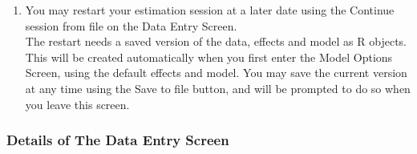 \documentclass[a4paper,fleqn,11pt]{article}
\newcommand{\+}{\, + \,}
\newcommand{\sfn}[1]{\textsf{#1}}
\begin{document}
{\begin{enumerate}
  is stored, with extension \texttt{.out} in the directory in which you start
  \sfn{siena.exe}.
\item You may restart your estimation session at a later date using the
  \sfn{Continue session from file} on the \sfn{Data Entry Screen}.\\
  The restart needs a saved version of the data, effects and model as R
  objects. This will be created automatically when you first enter the
  \sfn{Model Options Screen}, using the default effects and model. You may save
  the current version at any time using the \sfn{Save to file} button, and will
  be prompted to do so when you leave this screen.
\end{enumerate}

\subsubsection{Details of The Data Entry Screen}
\label{S_de_screen}

}
\end{document}
